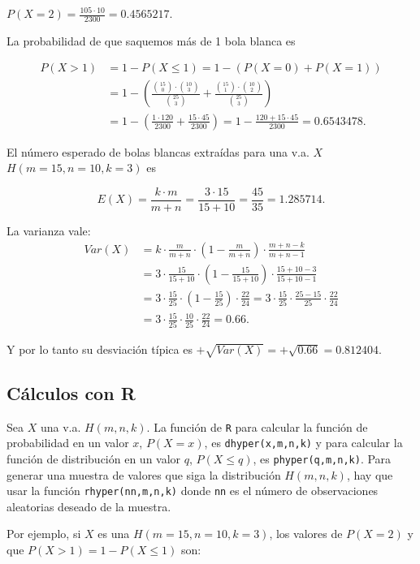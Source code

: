 \documentclass[
  letterpaper,
  DIV=11,
  numbers=noendperiod]{scrreprt}
\begin{document}
\(P(X=2)=\frac{105\cdot10 }{2300}=0.4565217.\)

La probabilidad de que saquemos más de 1 bola blanca es

\[
\begin{array}{rl}
P(X> 1)&= 1-P(X\leq 1)=1-(P(X=0)+P(X=1))\\
&=
1-\left(\frac{\binom{15}{0}\cdot \binom{10}{3}}{\binom{25}{3}}+
\frac{\binom{15}{1}\cdot \binom{10}{2}}{\binom{25}{3}}\right)\\
&=
1-\left(
\frac{1\cdot120 }{2300}+\frac{15\cdot45 }{2300}
\right)=1-\frac{120+15\cdot 45}{2300}=0.6543478.
\end{array}
\]

El número esperado de bolas blancas extraídas para una v.a. \(X\)
\(H(m=15,n=10,k=3)\) es

\[E(X)=\frac{k\cdot m}{m+n}=\frac{3\cdot 15}{15+10}=\frac{45}{35}=1.285714.\]

La varianza vale: \[
\begin{array}{rl}
Var(X)&=k\cdot\frac{m}{m+n}\cdot\left(1-\frac{m}{m+n}\right) \cdot\frac{m+n-k}{m+n-1}\\
&=3\cdot\frac{15}{15+10}\cdot\left(1-\frac{15}{15+10}\right) \cdot\frac{15+10-3}{15+10-1}\\
&=
3\cdot\frac{15}{25}\cdot\left(1-\frac{15}{25}\right) \cdot\frac{22}{24}= 
3\cdot\frac{15}{25}\cdot\frac{25-15}{25} \cdot\frac{22}{24}\\
&=
3\cdot\frac{15}{25}\cdot\frac{10}{25}\cdot\frac{22}{24}=0.66.
\end{array}
\]

Y por lo tanto su desviación típica es
\(+\sqrt{Var(X)}=+\sqrt{0.66}=0.812404.\)

\subsection{Cálculos con R}\label{cuxe1lculos-con-r-2}

Sea \(X\) una v.a. \(H(m,n,k)\). La función de \texttt{R} para calcular
la función de probabilidad en un valor \(x\), \(P(X=x)\), es
\texttt{dhyper(x,m,n,k)} y para calcular la función de distribución en
un valor \(q\), \(P(X\leq q)\), es \texttt{phyper(q,m,n,k)}. Para
generar una muestra de valores que siga la distribución \(H(m,n,k)\),
hay que usar la función \texttt{rhyper(nn,m,n,k)} donde \texttt{nn} es
el número de observaciones aleatorias deseado de la muestra.

Por ejemplo, si \(X\) es una \(H(m=15,n=10,k=3)\), los valores de
\(P(X=2)\) y que \(P(X>1)=1-P(X\leq 1)\) son:
\end{document}
